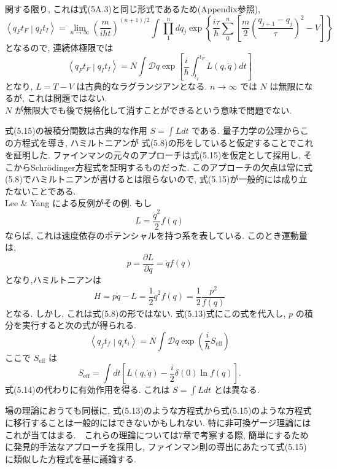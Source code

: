 \documentclass[a4paper,12pt]{article}
\newcommand{\braket}[2]{\left\langle #1\middle|#2\right\rangle}
\begin{document}
関する限り, これは式(5A.3)と同じ形式であるため(Appendix参照),
\begin{equation*}
    \braket{q_{F}t_{F}}{q_{I}t_{I}} = \lim_{n \rightarrow \infty} \left( \frac{m}{iht} \right)^{(n+1)/2} \int \prod_{1}^{n}dq_{j}\exp\left\{ \frac{i\tau}{\hbar}\sum_{0}^{n}\left[ \frac{m}{2} \left(\frac{q_{j+1} - q_{j}}{\tau}\right)^2 -V \right] \right\}\tag{5.14}
\end{equation*}
となるので, 連続体極限では
\begin{equation*}
    \braket{q_{F}t_{F}}{q_{I}t_{I}} = N\int \mathcal{D}q \exp\left[ \frac{i}{\hbar}\int_{t_I}^{t_F} L(q, \dot{q})dt \right] \tag{5.15}
\end{equation*}
となり, $L = T - V$ は古典的なラグランジアンとなる. $n \rightarrow \infty$ では $N$ は無限になるが, これは問題ではない.\\
\color{blue}
$N$ が無限大でも後で規格化して消すことができるという意味で問題でない.
\color{black}\par
式(5.15)の被積分関数は古典的な作用 $\displaystyle S = \int L dt$ である. 量子力学の公理からこの方程式を導き, ハミルトニアンが 式(5.8)の形をしていると仮定することでこれを証明した. ファインマンの元々のアプローチは式(5.15)を仮定として採用し, そこからSchr\"{o}dinger方程式を証明するものだった. このアプローチの欠点は常に式(5.8)でハミルトニアンが書けるとは限らないので, 式(5.15)が一般的には成り立たないことである.\\
 Lee \& Yang による反例がその例. もし
\begin{equation*}
    L = \frac{\dot{q}^2}{2}f(q)
\end{equation*} 
ならば, これは速度依存のポテンシャルを持つ系を表している. このとき運動量は,
\begin{equation*}
    p = \frac{\partial L}{\partial \dot{q}} = \dot{q}f(q)
\end{equation*}
となり,ハミルトニアンは
\begin{equation*}
    H = p\dot{q} - L = \frac{1}{2}\dot{q}^2 f(q) = \frac{1}{2}\frac{p^2}{f(q)}
\end{equation*}
となる. しかし, これは式(5.8)の形ではない. 式(5.13)式にこの式を代入し, $p$ の積分を実行すると次の式が得られる.
\begin{equation*}
    \braket{q_{f}t_{f}}{q_{i}t_{i}} = N\int \mathcal{D}q \exp\left( \frac{i}{\hbar}S_{\textrm{eff}} \right)
\end{equation*}
ここで $S_{\textrm{eff}}$ は
\begin{equation*}
    S_{\textrm{eff}} = \int dt \left[ L(q, \dot{q}) - \frac{i}{2}\delta(0)\ln f(q) \right].
\end{equation*}
式(5.14)の代わりに有効作用を得る. これは $\displaystyle S = \int L dt$ とは異なる.\par
場の理論におうても同様に, 式(5.13)のような方程式から式(5.15)のような方程式に移行することは一般的にはできないかもしれない. 特に非可換ゲージ理論にはこれが当てはまる.　これらの理論については7章で考察する際, 簡単にするために発見的手法なアプローチを採用し, ファインマン則の導出にあたって式(5.15)に類似した方程式を基に議論する.
\end{document}
